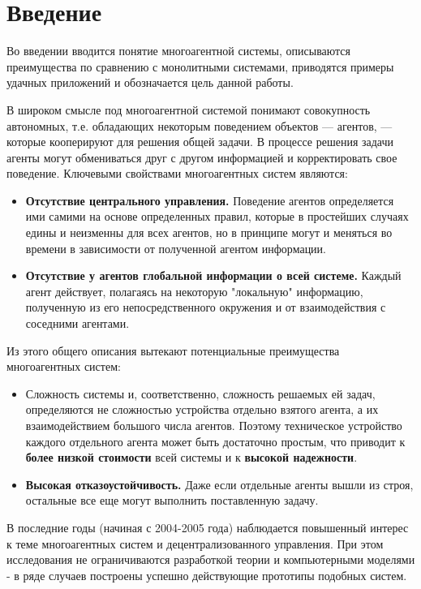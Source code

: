 \section*{Введение}					    %

Во введении вводится понятие многоагентной системы, описываются преимущества по сравнению с монолитными системами, приводятся примеры удачных приложений и обозначается цель данной работы.

В широком смысле под многоагентной системой понимают
совокупность автономных, т.е. обладающих некоторым 
поведением объектов --- агентов, --- которые кооперируют для решения общей задачи. В процессе решения
задачи агенты могут обмениваться друг с другом
информацией и корректировать свое поведение. 
Ключевыми свойствами многоагентных систем являются:
\begin{itemize}
\item \textbf{Отсутствие центрального управления.} Поведение
агентов определяется ими самими на основе определенных
правил, которые в простейших случаях едины и неизменны
для всех агентов, но в принципе могут и меняться во
времени в зависимости от полученной агентом информации.
\item \textbf{Отсутствие у агентов глобальной информации о всей
системе.} Каждый агент действует, полагаясь на некоторую
"локальную" информацию, полученную из его
непосредственного окружения и от взаимодействия с  соседними агентами.
\end{itemize}

Из этого общего описания вытекают потенциальные преимущества многоагентных систем:
\begin{itemize}
\item Сложность системы и,
 соответственно, сложность решаемых ей задач, определяются 
 не сложностью устройства 
отдельно взятого агента, а их взаимодействием большого числа агентов. 
Поэтому техническое устройство каждого отдельного агента  
может быть достаточно простым, что приводит к \textbf{более низкой стоимости} всей системы и к \textbf{высокой надежности}.
\item \textbf{Высокая отказоустойчивость.} Даже если отдельные агенты вышли из строя, остальные все еще могут выполнить поставленную задачу.
\end{itemize}

В последние годы (начиная с 2004-2005 года) наблюдается
повышенный интерес к теме многоагентных систем и
децентрализованного управления. При этом исследования
не ограничиваются разработкой теории и компьютерными
моделями - в ряде случаев построены успешно
действующие прототипы подобных систем. 

